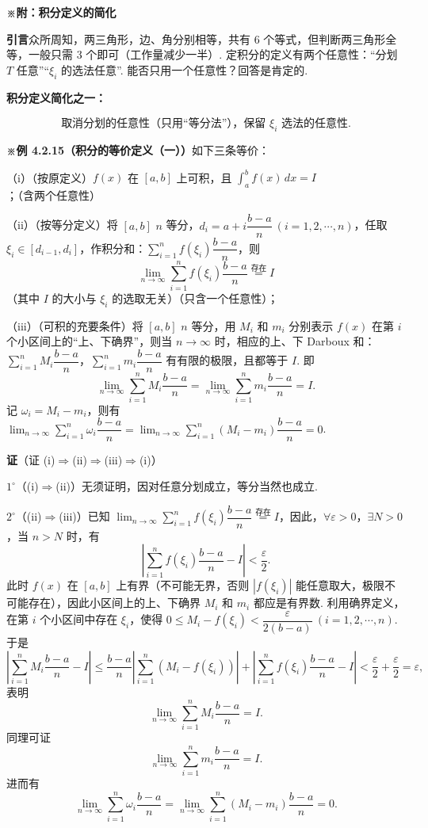 \documentclass[UTF8, 12pt, fontset=fandol, oneside]{ctexart}
\begin{document}
\noindent\textbf{※附：积分定义的简化}

\noindent\textbf{引言}\quad 众所周知，两三角形，边、角分别相等，共有 6 个等式，但判断两三角形全等，一般只需 3 个即可（工作量减少一半）. 定积分的定义有两个任意性：“分划 $T$ 任意”“$\xi_i$ 的选法任意”. 能否只用一个任意性？回答是肯定的.

\noindent\textbf{积分定义简化之一：}

\[
\text{取消分划的任意性（只用“等分法”），保留 $\xi_i$ 选法的任意性.}
\]

\noindent\textbf{※例 4.2.15（积分的等价定义（一））}\quad 如下三条等价：

（i）（按原定义）$f(x)$ 在 $[a,b]$ 上可积，且 $\int_a^b f(x)\,dx=I$；（含两个任意性）

（ii）（按等分定义）将 $[a,b]$ $n$ 等分，$d_i=a+i\dfrac{b-a}{n}\ (i=1,2,\cdots,n)$，任取 $\xi_i\in[d_{i-1},d_i]$，作积分和：$\sum_{i=1}^n f(\xi_i)\dfrac{b-a}{n}$，则
\[
\lim_{n\to\infty}\sum_{i=1}^n f(\xi_i)\frac{b-a}{n}\stackrel{\text{存在}}{=}I
\]
（其中 $I$ 的大小与 $\xi_i$ 的选取无关）（只含一个任意性）；

（iii）（可积的充要条件）将 $[a,b]$ $n$ 等分，用 $M_i$ 和 $m_i$ 分别表示 $f(x)$ 在第 $i$ 个小区间上的“上、下确界”，则当 $n\to\infty$ 时，相应的上、下 Darboux 和：$\sum_{i=1}^n M_i\dfrac{b-a}{n}$，$\sum_{i=1}^n m_i\dfrac{b-a}{n}$ 有有限的极限，且都等于 $I$. 即
\[
\lim_{n\to\infty}\sum_{i=1}^nM_i\frac{b-a}{n}
=\lim_{n\to\infty}\sum_{i=1}^n m_i\frac{b-a}{n}=I.
\]
记 $\omega_i=M_i-m_i$，则有 $\lim_{n\to\infty}\sum_{i=1}^n\omega_i\dfrac{b-a}{n}=\lim_{n\to\infty}\sum_{i=1}^n(M_i-m_i)\dfrac{b-a}{n}=0$.

\noindent\textbf{证}\quad （证 (i)$\Rightarrow$(ii)$\Rightarrow$(iii)$\Rightarrow$(i)）

$1^\circ$（(i)$\Rightarrow$(ii)）无须证明，因对任意分划成立，等分当然也成立.

$2^\circ$（(ii)$\Rightarrow$(iii)）已知 $\lim_{n\to\infty}\sum_{i=1}^n f(\xi_i)\dfrac{b-a}{n}\stackrel{\text{存在}}{=}I$，因此，$\forall\varepsilon>0$，$\exists N>0$，当 $n>N$ 时，有
\[
\left|\sum_{i=1}^n f(\xi_i)\frac{b-a}{n}-I\right|<\frac{\varepsilon}{2}.
\]
此时 $f(x)$ 在 $[a,b]$ 上有界（不可能无界，否则 $|f(\xi_i)|$ 能任意取大，极限不可能存在），因此小区间上的上、下确界 $M_i$ 和 $m_i$ 都应是有界数. 利用确界定义，在第 $i$ 个小区间中存在 $\xi_i$，使得 $0\le M_i-f(\xi_i)<\dfrac{\varepsilon}{2(b-a)}\ (i=1,2,\cdots,n)$. 于是
\[
\left|\sum_{i=1}^n M_i\frac{b-a}{n}-I\right|
\le \frac{b-a}{n}\left|\sum_{i=1}^n(M_i-f(\xi_i))\right|
+\left|\sum_{i=1}^n f(\xi_i)\frac{b-a}{n}-I\right|
<\frac{\varepsilon}{2}+\frac{\varepsilon}{2}=\varepsilon,
\]
表明
\[
\lim_{n\to\infty}\sum_{i=1}^n M_i\frac{b-a}{n}=I.
\]
同理可证
\[
\lim_{n\to\infty}\sum_{i=1}^n m_i\frac{b-a}{n}=I.
\]
进而有
\[
\lim_{n\to\infty}\sum_{i=1}^n\omega_i\frac{b-a}{n}
=\lim_{n\to\infty}\sum_{i=1}^n(M_i-m_i)\frac{b-a}{n}=0.
\]
\end{document}
